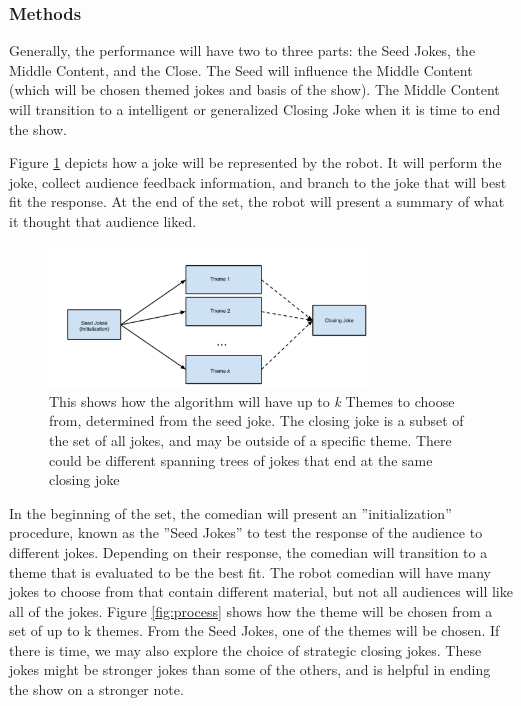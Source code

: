 \subsubsection{Methods}
Generally, the performance will have two to three parts: the Seed Jokes, the Middle Content, and the Close. The Seed
will influence the Middle Content (which will be chosen themed jokes and basis of the show). The Middle Content will
transition to a intelligent or generalized Closing Joke when it is time to end the show.


Figure \ref{fig:joke} depicts how a joke will be represented by the robot. It will perform the joke, collect audience feedback
information, and branch to the joke that will best fit the response. At the end of the set, the robot will present a summary
of what it thought that audience liked.
\begin{figure}[H]
  \centering
  \includegraphics[width=0.75\textwidth,height=0.75\textheight,keepaspectratio]{fig0}
  \caption{This shows how the algorithm will have up to \textit{k} Themes to choose from, determined from the seed joke. The closing joke is a subset of the set of all jokes, and may be outside of a specific theme. There could be different spanning trees of jokes that end at the same closing joke}
  \label{fig:joke}
\end{figure}

In the beginning of the set, the comedian will present an ”initialization” procedure, known
as the ”Seed Jokes” to test the response of the audience to different jokes. Depending on their response, the comedian
will transition to a theme that is evaluated to be the best fit. The robot comedian will have many jokes to choose from
that contain different material, but not all audiences will like all of the jokes. Figure \ref{fig:process} shows how the theme will be
chosen from a set of up to k themes. From the Seed Jokes, one of the themes will be chosen. If there is time, we may also
explore the choice of strategic closing jokes. These jokes might be stronger jokes than some of the others, and is helpful
in ending the show on a stronger note.

